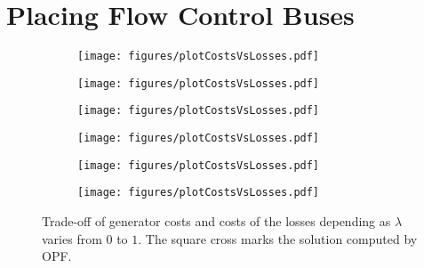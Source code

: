 \documentclass{article}[11pt,a4paper]
\begin{document}
\section{Placing Flow Control Buses} \label{app:hybridmodel}
\begin{figure}[H]\begin{subfigure}[t]{.45\textwidth}
  	\centering
    	\texttt{[image: figures/plotCostsVsLosses.pdf]}
	\label{fig:plot-costs-losses-case6}  
  \end{subfigure}
\hfill
  \begin{subfigure}[t]{.45\textwidth}
  	\centering
    	\texttt{[image: figures/plotCostsVsLosses.pdf]}
	\label{fig:plot-costs-losses-case9}
\end{subfigure}

\vspace{0.3cm}
\begin{subfigure}[t]{.45\textwidth}
  	\centering
    	\texttt{[image: figures/plotCostsVsLosses.pdf]}
\end{subfigure}
\hfill
\begin{subfigure}[t]{.45\textwidth}
  	\centering
    	\texttt{[image: figures/plotCostsVsLosses.pdf]}
	\label{fig:plot-costs-losses-case39}
\end{subfigure}

\vspace{0.3cm}
\begin{subfigure}[t]{.45\textwidth}
  	\centering
    	\texttt{[image: figures/plotCostsVsLosses.pdf]}
	\label{fig:plot-costs-losses-case57}
\end{subfigure}
\hfill
\begin{subfigure}[b]{.45\textwidth}
  	\centering
    	\texttt{[image: figures/plotCostsVsLosses.pdf]}
	\label{fig:plot-costs-losses-case118}
\end{subfigure}
\vspace{0cm}
\caption{Trade-off of generator costs and costs of the losses
          depending as $\lambda$ varies from $0$ to $1$.   The square cross marks the solution computed by OPF.}
\end{figure}
\end{document}
